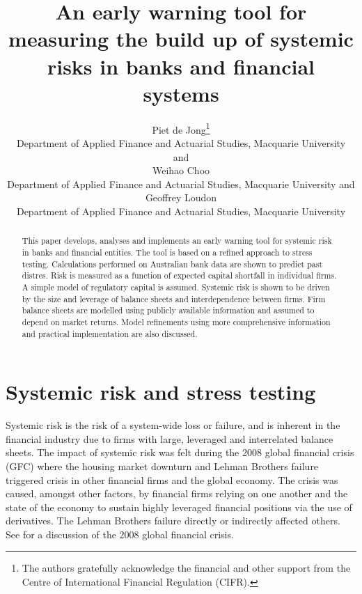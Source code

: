 \documentclass[authoryear]{elsarticle}
\begin{document}
\begin{frontmatter}



\title{An early warning tool for measuring the build up of systemic risks in banks and financial systems}

  \author{Piet de Jong\footnote{
    The authors gratefully acknowledge the financial and other support from the Centre of International Financial Regulation (CIFR).}\hspace{.2cm}\\
    Department of Applied Finance and Actuarial Studies, Macquarie University\\
    and\\
    Weihao Choo\\
    Department of Applied Finance and Actuarial Studies, Macquarie University
        and \\
    Geoffrey Loudon\\
    Department of Applied Finance and Actuarial Studies, Macquarie University\\}



\begin{abstract}
This paper develops, analyses and implements an early warning tool for  systemic risk in banks and financial entities. The tool is based on a refined approach to stress testing. Calculations performed on Australian bank data are shown to predict past distres. Risk is measured as  a function of expected capital shortfall in individual firms. A simple model of regulatory capital is assumed. Systemic risk is shown to be driven by the size and leverage of balance sheets and interdependence between firms.  Firm balance sheets are modelled using publicly available information and assumed to depend on market returns. Model refinements using more comprehensive information and practical implementation are also discussed.

\end{abstract}

\end{frontmatter}




\section{Systemic risk and stress testing}\label{sreview}

Systemic risk is the risk of a system-wide loss or failure, and is inherent in the financial industry due to firms with large, leveraged and interrelated balance sheets. The impact of systemic risk was felt
 during the 2008 global financial crisis (GFC) where the housing market downturn and Lehman Brothers failure triggered crisis in other financial firms and the global economy. The crisis was caused, amongst  other factors, by financial firms relying on one another and the state of the economy to sustain highly leveraged financial positions via the use of derivatives. The Lehman Brothers  failure directly or indirectly affected others. See \cite{kolb2010lessons} for a discussion of the 2008 global financial crisis.
\end{document}
